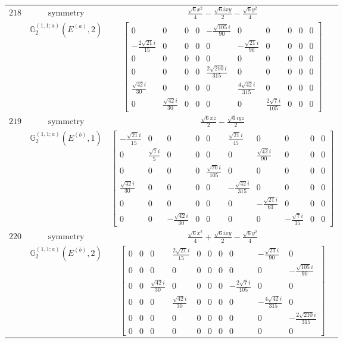 \documentclass[fleqn,8pt,landscape]{jsarticle}
\begin{document}
\begin{longtable}{ccc}
$ 218 $ & $ \text{symmetry} $ & $ \frac{\sqrt{6} x^{2}}{4} - \frac{\sqrt{6} i x y}{2} - \frac{\sqrt{6} y^{2}}{4} $ \\
$  $ & $ \mathbb{G}_{2}^{(1,1;a)}(E^{(a)},2) $ & $ \begin{bmatrix} 0 & 0 & 0 & 0 & - \frac{\sqrt{105} i}{90} & 0 & 0 & 0 & 0 & 0 \\ - \frac{2 \sqrt{21} i}{15} & 0 & 0 & 0 & 0 & - \frac{\sqrt{21} i}{90} & 0 & 0 & 0 & 0 \\ 0 & 0 & 0 & 0 & 0 & 0 & 0 & 0 & 0 & 0 \\ 0 & 0 & 0 & 0 & \frac{2 \sqrt{210} i}{315} & 0 & 0 & 0 & 0 & 0 \\ \frac{\sqrt{42} i}{30} & 0 & 0 & 0 & 0 & \frac{4 \sqrt{42} i}{315} & 0 & 0 & 0 & 0 \\ 0 & \frac{\sqrt{42} i}{30} & 0 & 0 & 0 & 0 & \frac{2 \sqrt{7} i}{105} & 0 & 0 & 0 \end{bmatrix} $ \\ \hline
$ 219 $ & $ \text{symmetry} $ & $ \frac{\sqrt{6} x z}{2} - \frac{\sqrt{6} i y z}{2} $ \\
$  $ & $ \mathbb{G}_{2}^{(1,1;a)}(E^{(b)},1) $ & $ \begin{bmatrix} - \frac{\sqrt{21} i}{15} & 0 & 0 & 0 & 0 & \frac{\sqrt{21} i}{45} & 0 & 0 & 0 & 0 \\ 0 & \frac{\sqrt{7} i}{5} & 0 & 0 & 0 & 0 & \frac{\sqrt{42} i}{90} & 0 & 0 & 0 \\ 0 & 0 & 0 & 0 & \frac{\sqrt{70} i}{105} & 0 & 0 & 0 & 0 & 0 \\ \frac{\sqrt{42} i}{30} & 0 & 0 & 0 & 0 & - \frac{\sqrt{42} i}{315} & 0 & 0 & 0 & 0 \\ 0 & 0 & 0 & 0 & 0 & 0 & - \frac{\sqrt{21} i}{63} & 0 & 0 & 0 \\ 0 & 0 & - \frac{\sqrt{42} i}{30} & 0 & 0 & 0 & 0 & - \frac{\sqrt{7} i}{35} & 0 & 0 \end{bmatrix} $ \\ \hline
$ 220 $ & $ \text{symmetry} $ & $ \frac{\sqrt{6} x^{2}}{4} + \frac{\sqrt{6} i x y}{2} - \frac{\sqrt{6} y^{2}}{4} $ \\
$  $ & $ \mathbb{G}_{2}^{(1,1;a)}(E^{(b)},2) $ & $ \begin{bmatrix} 0 & 0 & 0 & \frac{2 \sqrt{21} i}{15} & 0 & 0 & 0 & 0 & - \frac{\sqrt{21} i}{90} & 0 \\ 0 & 0 & 0 & 0 & 0 & 0 & 0 & 0 & 0 & - \frac{\sqrt{105} i}{90} \\ 0 & 0 & \frac{\sqrt{42} i}{30} & 0 & 0 & 0 & 0 & - \frac{2 \sqrt{7} i}{105} & 0 & 0 \\ 0 & 0 & 0 & \frac{\sqrt{42} i}{30} & 0 & 0 & 0 & 0 & - \frac{4 \sqrt{42} i}{315} & 0 \\ 0 & 0 & 0 & 0 & 0 & 0 & 0 & 0 & 0 & - \frac{2 \sqrt{210} i}{315} \\ 0 & 0 & 0 & 0 & 0 & 0 & 0 & 0 & 0 & 0 \end{bmatrix} $ \\ \hline

\end{longtable}
\end{document}
